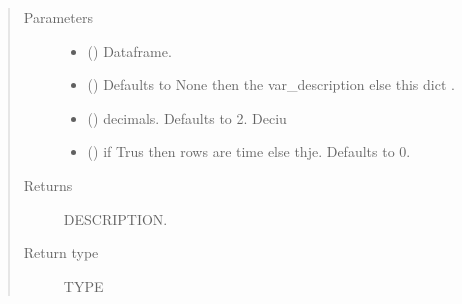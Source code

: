 \documentclass[letterpaper,10pt,english]{sphinxmanual}
\begin{document}
\begin{fulllineitems}
\begin{fulllineitems}
\label{\detokenize{core/modelclass:modelclass.Display_Mixin.ibsstyle_old}}
\pysigstartsignatures
{}
\pysigstopsignatures\begin{quote}\begin{description}
\item[{Parameters}] \leavevmode\begin{itemize}
\item {} 
\sphinxAtStartPar
{} () \textendash{} Dataframe.

\item {} 
\sphinxAtStartPar
{} (\sphinxstyleliteralemphasis{\sphinxupquote{, }}) \textendash{} Defaults to None then the var\_description else this dict .

\item {} 
\sphinxAtStartPar
{} (\sphinxstyleliteralemphasis{\sphinxupquote{, }}) \textendash{} decimals. Defaults to 2. Deciu

\item {} 
\sphinxAtStartPar
{} (\sphinxstyleliteralemphasis{\sphinxupquote{, }}) \textendash{} if Trus then rows are time else thje. Defaults to 0.

\end{itemize}

\item[{Returns}] \leavevmode
\sphinxAtStartPar
DESCRIPTION.

\item[{Return type}] \leavevmode
\sphinxAtStartPar
TYPE

\end{description}\end{quote}


\end{fulllineitems}
\end{fulllineitems}
\end{document}
